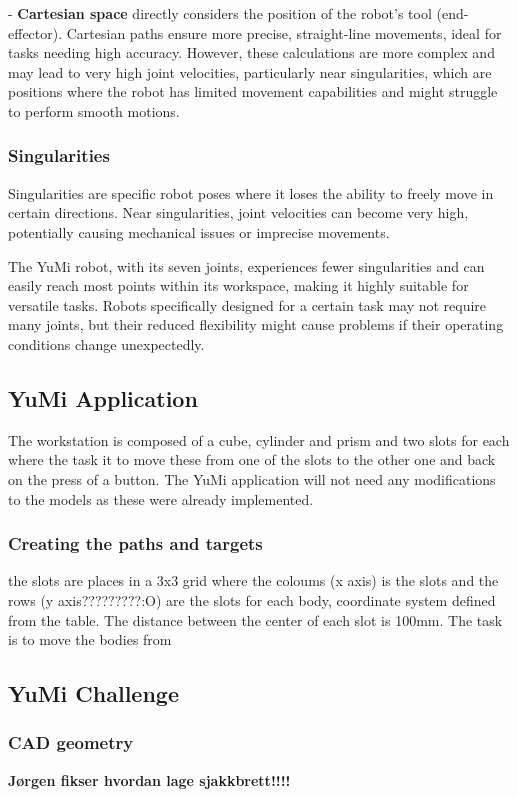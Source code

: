 \documentclass[a4paper,12pt]{article}
\begin{document}
- \textbf{Cartesian space} directly considers the position of the robot's tool (end-effector). Cartesian paths ensure more precise, straight-line movements, ideal for tasks needing high accuracy. However, these calculations are more complex and may lead to very high joint velocities, particularly near singularities, which are positions where the robot has limited movement capabilities and might struggle to perform smooth motions.

\subsubsection{Singularities}
Singularities are specific robot poses where it loses the ability to freely move in certain directions. Near singularities, joint velocities can become very high, potentially causing mechanical issues or imprecise movements.

The YuMi robot, with its seven joints, experiences fewer singularities and can easily reach most points within its workspace, making it highly suitable for versatile tasks. Robots specifically designed for a certain task may not require many joints, but their reduced flexibility might cause problems if their operating conditions change unexpectedly.



\subsection{YuMi Application}
The workstation is composed of a cube, cylinder and prism and two slots for each where the task it to move these from one of the slots to the other one and back on the press of a button.
The YuMi application will not need any modifications to the models as these were already implemented.
\subsubsection{Creating the paths and targets}
the slots are places in a 3x3 grid where the coloums (x axis) is the slots and the rows (y axis?????????:O) are the slots for each body, coordinate system defined from the table. The distance between the center of each slot is 100mm. The task is to move the bodies from  

\subsection{YuMi Challenge}
\subsubsection{CAD geometry}
\textbf{Jørgen fikser hvordan lage sjakkbrett!!!!}
\end{document}
